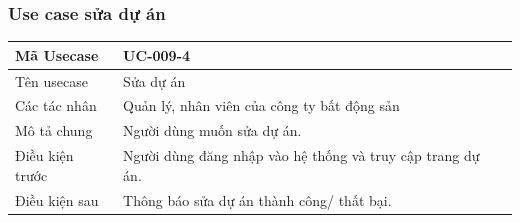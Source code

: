 \documentclass[12pt,a4paper]{article}
\begin{document}
    \subsubsection*{Use case sửa dự án }
    \begin{table}[H]
        \centering
        \begin{tabular}{|p{3.5cm}|p{11.5cm}|c|}
            \hline
            Mã Usecase      & UC-009-4                                                   \\
            \hline
            Tên usecase     & Sửa dự án                                                  \\
            \hline
            Các tác nhân    & Quản lý, nhân viên của công ty bất động sản                \\
            \hline
            Mô tả chung     & Người dùng muốn sửa dự án.                                 \\
            \hline

            Điều kiện trước & Người dùng đăng nhập vào hệ thống và truy cập trang dự án. \\
            \hline

            Điều kiện sau   & Thông báo sửa dự án thành công/ thất bại.                  \\
            \hline


\end{tabular}
\end{table}
\end{document}
